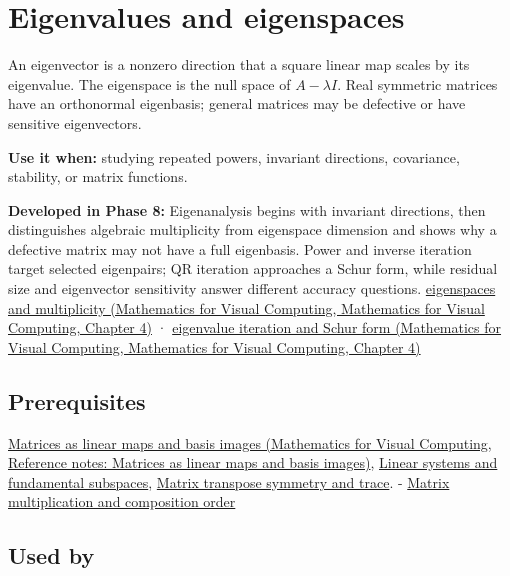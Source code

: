 \hypertarget{appendix-0b3be18411f9}{}\label{referencestart:appendix-0b3be18411f9}
\section{Eigenvalues and eigenspaces}\label{appendix-0b3be18411f9-eigenvalues-and-eigenspaces}

An eigenvector is a nonzero direction that a square linear map scales by its eigenvalue. The eigenspace is the null space of \(A-\lambda I\). Real symmetric matrices have an orthonormal eigenbasis; general matrices may be defective or have sensitive eigenvectors.

\textbf{Use it when:} studying repeated powers, invariant directions, covariance, stability, or matrix functions.

\textbf{Developed in Phase 8:} Eigenanalysis begins with invariant directions, then distinguishes algebraic multiplicity from eigenspace dimension and shows why a defective matrix may not have a full eigenbasis. Power and inverse iteration target selected eigenpairs; QR iteration approaches a Schur form, while residual size and eigenvector sensitivity answer different accuracy questions. \href{../02-Mathematics-for-Visual-Computing/main.pdf\#nameddest=01-foundations-i-ch020-eigenvalues-eigenspaces-and-the-two-kinds-of-multiplicity}{eigenspaces and multiplicity (Mathematics for Visual Computing, Mathematics for Visual Computing, Chapter 4)} · \href{../02-Mathematics-for-Visual-Computing/main.pdf\#nameddest=01-foundations-i-ch020-qr-iteration-and-jacobi-rotations-preserve-the-spectrum-while-simplifying-shape}{eigenvalue iteration and Schur form (Mathematics for Visual Computing, Mathematics for Visual Computing, Chapter 4)}

\subsection{Prerequisites}\label{appendix-0b3be18411f9-prerequisites}

\href{../02-Mathematics-for-Visual-Computing/main.pdf\#nameddest=appendix-bd39c3bf5d64}{Matrices as linear maps and basis images (Mathematics for Visual Computing, Reference notes: Matrices as linear maps and basis images)}, \hyperref[appendix-8572a4a060c1]{Linear systems and fundamental subspaces}, \hyperref[appendix-175ca5ff874d]{Matrix transpose symmetry and trace}. - \hyperref[appendix-ab31ef447dbf]{Matrix multiplication and composition order}

\subsection{Used by}\label{appendix-0b3be18411f9-used-by}

